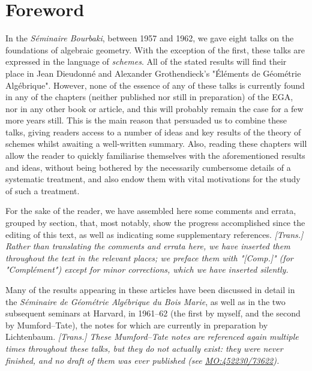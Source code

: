 \part{Foreword}\label{fga-foreword}\thispagestyle{fancy}\par{}In the \emph{Séminaire Bourbaki}, between 1957 and 1962, we gave eight talks on the foundations of algebraic geometry.
  With the exception of the first, these talks are expressed in the language of \emph{schemes}.
  All of the stated results will find their place in Jean Dieudonné and Alexander Grothendieck's "Éléments de Géométrie Algébrique".
  However, none of the essence of any of these talks is currently found in any of the chapters (neither published nor still in preparation) of the EGA, nor in any other book or article, and this will probably remain the case for a few more years still.
  This is the main reason that persuaded us to combine these talks, giving readers access to a number of ideas and key results of the theory of schemes whilst awaiting a well-written summary.
  Also, reading these chapters will allow the reader to quickly familiarise themselves with the aforementioned results and ideas, without being bothered by the necessarily cumbersome details of a systematic treatment, and also endow them with vital motivations for the study of such a treatment.\par{}For the sake of the reader, we have assembled here some comments and errata, grouped by section, that, most notably, show the progress accomplished since the editing of this text, as well as indicating some supplementary references.
  \emph{[Trans.] Rather than translating the comments and errata here, we have inserted them throughout the text in the relevant places; we preface them with "\emph{[Comp.]}" (for "Complément") except for minor corrections, which we have inserted silently.}\par{}Many of the results appearing in these articles have been discussed in detail in the \emph{Séminaire de Géométrie Algébrique du Bois Marie}, as well as in the two subsequent seminars at Harvard, in 1961–62 (the first by myself, and the second by Mumford–Tate), the notes for which are currently in preparation by Lichtenbaum.
  \emph{[Trans.] These Mumford–Tate notes are referenced again multiple times throughout these talks, but they do not actually exist: they were never finished, and no draft of them was ever published (see \url{MO:452230/73622}).}